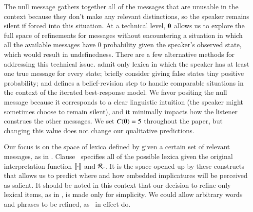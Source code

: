 \documentclass[leqno,12pt]{article}
\begin{document}

The null message gathers together all of the messages that are
unusable in the context because they don't make any relevant
distinctions, so the speaker remains silent if forced into this
situation. At a technical level, $\mathbf{0}$ allows us to explore the
full space of refinements for messages without encountering a
situation in which all the available messages have $0$ probability
given the speaker's observed state, which would result in
undefinedness. There are a few alternative methods for addressing this
technical issue. \citet{Bergen:Goodman:Levy:2012} admit only lexica in
which the speaker has at least one true message for every state;
\citet{Bergen:Levy:Goodman:2014} briefly consider giving false states
tiny positive probability; and \citet{Jaeger:2011} defines a
belief-revision step to handle comparable situations in the context of
the iterated best-response model. We favor positing the null message
because it corresponds to a clear linguistic intuition (the speaker
might sometimes choose to remain silent), and it minimally impacts how
the listener construes the other messages.  We set
$C(\mathbf{0}) = 5$ throughout the paper, but changing this value
does not change our qualitative predictions.

Our focus is on the space of lexica defined by
 given a certain set of relevant messages,
as in . Clause~
specifies all of the possible lexica given the original interpretation
function $\llbracket\cdot\rrbracket$ and $\mathcal{R}_{c}$. It is the space opened up by
these constructs that allows us to predict where and how embedded
implicatures will be perceived as salient. It should be noted in this
context that our decision to refine only lexical items, as in
, is made only for simplicity. We could
allow arbitrary words and phrases to be refined, as \CFS\ in effect
do.

\end{document}
